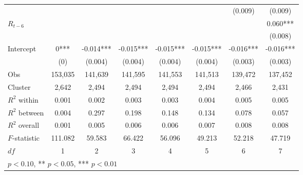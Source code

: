 {\begin{tabular}{l*{7}{c}}
            &               &               &               &               &               &     (0.009)   &     (0.009)   \\
[1em]
$R_{t-6}$&               &               &               &               &               &               &       0.060***\\[-0.2cm]
            &               &               &               &               &               &               &     (0.008)   \\
[1em]
Intercept      &       0***&      -0.014***&      -0.015***&      -0.015***&      -0.015***&      -0.016***&      -0.016***\\[-0.2cm]
            &     (0)   &     (0.004)   &     (0.004)   &     (0.004)   &     (0.004)   &     (0.003)   &     (0.003)   \\
\hline
Obs       &      153,035   &      141,639   &      141,595   &      141,553   &      141,513   &      139,472   &      137,452   \\
Cluster    &   2,642   &   2,494   &   2,494   &   2,494   &   2,494   &   2,466   &   2,431   \\
$R^2$ within       &       0.001   &       0.002   &       0.003   &       0.003   &       0.004   &       0.005   &       0.005   \\
$R^2$ between       &       0.004   &       0.297   &       0.198   &       0.148   &       0.134   &       0.078   &       0.057   \\
$R^2$ overall       &       0.001   &       0.005   &       0.006   &       0.006   &       0.007   &       0.008   &       0.008   \\
$F$-statistic          &     111.082   &      59.583   &      66.422   &      56.096   &      49.213   &      52.218   &      47.719   \\
$df$       &       1   &       2   &       3   &       4   &       5   &       6   &       7   \\
\hline\hline
\multicolumn{8}{l}{\footnotesize * \(p<0.10\), ** \(p<0.05\), *** \(p<0.01\)}\\
\end{tabular}
}
